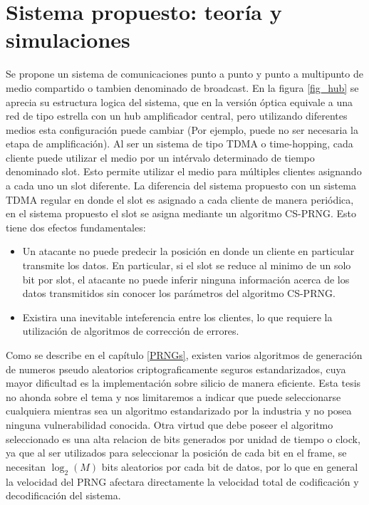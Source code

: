 \chapter{Sistema propuesto: teoría y simulaciones}

Se propone un sistema de comunicaciones punto a punto y punto a multipunto de medio compartido o tambien denominado de broadcast. En la figura \ref{fig_hub} se aprecia su estructura logica del sistema, que en la versión óptica equivale a una red de tipo estrella con un hub amplificador central, pero utilizando diferentes medios esta configuración puede cambiar (Por ejemplo, puede no ser necesaria la etapa de amplificación).
Al ser un sistema de tipo TDMA o time-hopping, cada cliente puede utilizar el medio por un intérvalo determinado de tiempo denominado slot. Esto permite utilizar el medio para múltiples clientes asignando a cada uno un slot diferente. La diferencia del sistema propuesto con un sistema TDMA regular en donde el slot es asignado a cada cliente de manera periódica, en el sistema propuesto el slot se asigna mediante un algoritmo CS-PRNG. Esto tiene dos efectos fundamentales: 

\begin{itemize}
 \item Un atacante no puede predecir la posición en donde un cliente en particular transmite los datos. En particular, si el slot se reduce al minimo de un solo bit por slot, el atacante no puede inferir ninguna información acerca de los datos transmitidos sin conocer los parámetros del algoritmo CS-PRNG.
 \item Existira una inevitable inteferencia entre los clientes, lo que requiere la utilización de algoritmos de corrección de errores.
\end{itemize}

Como se describe en el capítulo \ref{PRNGs}, existen varios algoritmos de generación de numeros pseudo aleatorios criptograficamente seguros estandarizados, cuya mayor dificultad es la implementación sobre silicio de manera eficiente. Esta tesis no ahonda sobre el tema y nos limitaremos a indicar que puede seleccionarse cualquiera mientras sea un algoritmo estandarizado por la industria y no posea ninguna vulnerabilidad conocida. Otra virtud que debe poseer el algoritmo seleccionado es una alta relacion de bits generados por unidad de tiempo o clock, ya que al ser utilizados para seleccionar la posición de cada bit en el frame, se necesitan $\log_2(M)$ bits aleatorios por cada bit de datos, por lo que en general la velocidad del PRNG afectara directamente la velocidad total de codificación y decodificación del sistema.

